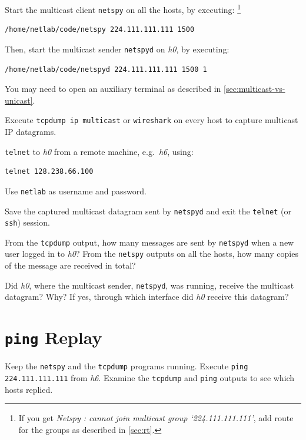 \documentclass{../UTNetLab}
\begin{document}
    Start the multicast client \lstinline{netspy} on all the hosts, by executing:%
    \footnote{If you get \textit{Netspy : cannot join multicast group `224.111.111.111'}, add route for the groups as described in \autoref{sec:rt}.}
    \begin{lstlisting}
/home/netlab/code/netspy 224.111.111.111 1500
    \end{lstlisting}
    
    Then, start the multicast sender \lstinline{netspyd} on \textit{h0}, by executing:
    \begin{lstlisting}
/home/netlab/code/netspyd 224.111.111.111 1500 1
    \end{lstlisting}
    You may need to open an auxiliary terminal as described in \autoref{sec:multicast-vs-unicast}.
    
    Execute \lstinline{tcpdump ip multicast} or \lstinline{wireshark} on every host to capture multicast IP datagrams.


    \lstinline{telnet} to \textit{h0} from a remote machine, e.g.\ \textit{h6}, using:
    \begin{lstlisting}
telnet 128.238.66.100
    \end{lstlisting}
    Use \texttt{netlab} as username and password.

    Save the captured multicast datagram sent by \lstinline{netspyd} and exit the \lstinline{telnet} (or \lstinline{ssh}) session.

    \begin{report}
    \item From the \lstinline{tcpdump} output, how many messages are sent by \lstinline{netspyd} when a new user logged in to \textit{h0}?
    From the \lstinline{netspy} outputs on all the hosts, how many copies of the message are received in total?

    \item Did \textit{h0}, where the multicast sender, \lstinline{netspyd}, was running, receive the multicast datagram?
    Why?
    If yes, through which interface did \textit{h0} receive this datagram?
    \end{report}

\section{\texttt{ping} Replay}
    Keep the \lstinline{netspy} and the \lstinline{tcpdump} programs running.
    Execute \lstinline{ping 224.111.111.111} from \textit{h6}.
    Examine the \lstinline{tcpdump} and \lstinline{ping} outputs to see which hosts replied.
\end{document}
